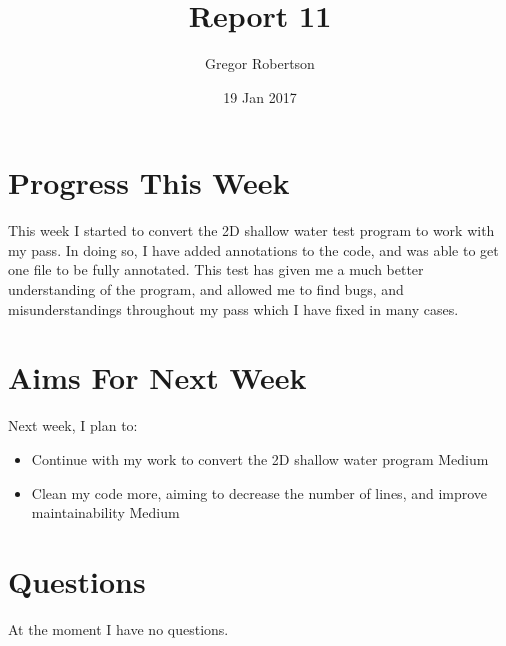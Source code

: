 \documentclass{article}
\title{Report 11}
\author{Gregor Robertson}
\date{19 Jan 2017}
\begin{document}
 
\maketitle
 
\section*{Progress This Week}
This week I started to convert the 2D shallow water test program to work with my pass. In doing so, I have added annotations to the code, and was able to get one file to be fully annotated. This test has given me a much better understanding of the program, and allowed me to find bugs, and misunderstandings throughout my pass which I have fixed in many cases.

\section*{Aims For Next Week}
Next week, I plan to:
\begin{itemize}
	\item Continue with my work to convert the 2D shallow water program \colorbox{BurntOrange}{\color{Black}Medium}
	\item Clean my code more, aiming to decrease the number of lines, and improve maintainability \colorbox{BurntOrange}{\color{Black}Medium}
\end{itemize}

\section*{Questions}
At the moment I have no questions.

\medskip
 
\printbibliography
\end{document}
